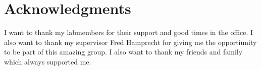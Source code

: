 \chapter{Acknowledgments}
I want to thank my labmembers for their support and good times in the office. I also want to thank my supervisor Fred Hamprecht for giving me the opportiunity to be part of this amazing group.
I also want to thank my friends and family which always supported me.